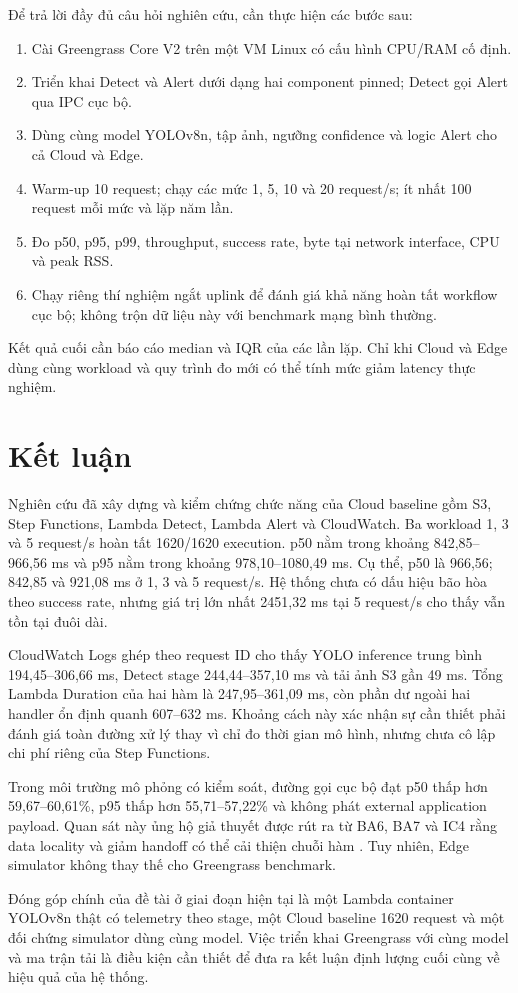 Để trả lời đầy đủ câu hỏi nghiên cứu, cần thực hiện các bước sau:

\begin{enumerate}
    \item Cài Greengrass Core V2 trên một VM Linux có cấu hình CPU/RAM cố định.
    \item Triển khai Detect và Alert dưới dạng hai component pinned; Detect gọi
    Alert qua IPC cục bộ.
    \item Dùng cùng model YOLOv8n, tập ảnh, ngưỡng confidence và logic Alert cho
    cả Cloud và Edge.
    \item Warm-up 10 request; chạy các mức 1, 5, 10 và 20 request/s; ít nhất 100
    request mỗi mức và lặp năm lần.
    \item Đo p50, p95, p99, throughput, success rate, byte tại network interface,
    CPU và peak RSS.
    \item Chạy riêng thí nghiệm ngắt uplink để đánh giá khả năng hoàn tất workflow
    cục bộ; không trộn dữ liệu này với benchmark mạng bình thường.
\end{enumerate}

Kết quả cuối cần báo cáo median và IQR của các lần lặp. Chỉ khi Cloud và Edge dùng
cùng workload và quy trình đo mới có thể tính mức giảm latency thực nghiệm.


\section{Kết luận}

Nghiên cứu đã xây dựng và kiểm chứng chức năng của Cloud baseline gồm S3, Step
Functions, Lambda Detect, Lambda Alert và CloudWatch. Ba workload 1, 3 và 5
request/s hoàn tất 1620/1620 execution. p50 nằm trong khoảng 842,85--966,56 ms và
p95 nằm trong khoảng 978,10--1080,49 ms. Cụ thể, p50 là 966,56; 842,85 và
921,08 ms ở 1, 3 và 5 request/s. Hệ thống chưa có dấu hiệu bão hòa theo success
rate, nhưng giá trị lớn nhất 2451,32 ms tại 5 request/s cho thấy vẫn tồn tại đuôi
dài.

CloudWatch Logs ghép theo request ID cho thấy YOLO inference trung bình
194,45--306,66 ms, Detect stage 244,44--357,10 ms và tải ảnh S3 gần 49 ms. Tổng
Lambda Duration của hai hàm là 247,95--361,09 ms, còn phần dư ngoài hai handler
ổn định quanh 607--632 ms. Khoảng cách này xác nhận sự cần thiết phải đánh giá toàn
đường xử lý thay vì chỉ đo thời gian mô hình, nhưng chưa cô lập chi phí riêng của
Step Functions.

Trong môi trường mô phỏng có kiểm soát, đường gọi cục bộ đạt p50 thấp hơn
59,67--60,61\%, p95 thấp hơn 55,71--57,22\% và không phát external application
payload. Quan sát này ủng hộ giả thuyết được rút
ra từ BA6, BA7 và IC4 rằng data locality và giảm handoff có thể cải thiện chuỗi hàm
\cite{malazi2026orchestrating}. Tuy nhiên, Edge simulator không thay thế cho
Greengrass benchmark.

Đóng góp chính của đề tài ở giai đoạn hiện tại là một Lambda container YOLOv8n
thật có telemetry theo stage, một Cloud baseline 1620 request và một đối chứng
simulator dùng cùng model. Việc triển khai Greengrass với cùng model và ma trận tải
là điều kiện cần thiết để đưa ra kết luận định lượng cuối cùng về hiệu quả của hệ
thống.
